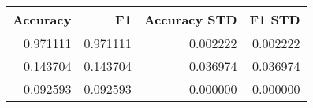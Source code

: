 \begin{tabular}{rrrr}
\toprule
Accuracy & F1 & Accuracy STD & F1 STD \\
\midrule
0.971111 & 0.971111 & 0.002222 & 0.002222 \\
0.143704 & 0.143704 & 0.036974 & 0.036974 \\
0.092593 & 0.092593 & 0.000000 & 0.000000 \\
\bottomrule
\end{tabular}
